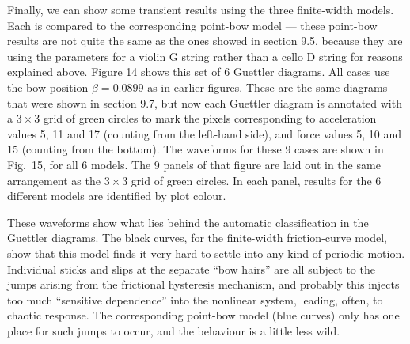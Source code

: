 







  Finally, we can show some transient results using the three finite-width 
  models. Each is compared to the corresponding point-bow model --- these 
  point-bow results are not quite the same as the ones showed in section 9.5, 
  because they are using the parameters for a violin G string rather than a 
  cello D string for reasons explained above. Figure 14 shows this set of 6 
  Guettler diagrams. All cases use the bow position $\beta = 0.0899$ as in 
  earlier figures. These are the same diagrams that were shown in section 9.7, 
  but now each Guettler diagram is annotated with a $3 \times 3$ grid of green 
  circles to mark the pixels corresponding to acceleration values 5, 11 and 17 
  (counting from the left-hand side), and force values 5, 10 and 15 (counting 
  from the bottom). The waveforms for these 9 cases are shown in Fig.\ 15, for 
  all 6 models. The 9 panels of that figure are laid out in the same 
  arrangement as the $3 \times 3$ grid of green circles. In each panel, results 
  for the 6 different models are identified by plot colour. 

  These waveforms show what lies behind the automatic classification in the 
  Guettler diagrams. The black curves, for the finite-width friction-curve 
  model, show that this model finds it very hard to settle into any kind of 
  periodic motion. Individual sticks and slips at the separate “bow hairs” are 
  all subject to the jumps arising from the frictional hysteresis mechanism, 
  and probably this injects too much “sensitive dependence” into the nonlinear 
  system, leading, often, to chaotic response. The corresponding point-bow 
  model (blue curves) only has one place for such jumps to occur, and the 
  behaviour is a little less wild. 

